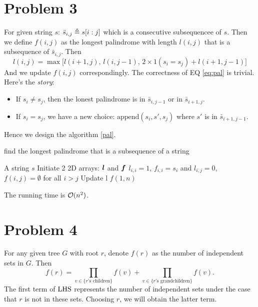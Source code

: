 \documentclass{article}
\begin{document}
\section*{Problem 3}
For given string $s$: $\bar{s}_{i,j}\triangleq s[i:j]$ which is a consecutive subsequencee of $s$. Then we define $f(i,j)$ as the longest palindrome with length $l(i,j)$ that is a subsequence of  $\bar{s}_{i,j}$.
Then
\begin{equation}
	\label{eq:pal}
	l(i,j)=\max\big[l(i+1,j),\,l(i,j-1),\,2\times1(s_i=s_j)+l(i+1,j-1)\big]
\end{equation}
And we update $f(i,j)$ correspondingly. The correctness of EQ \ref{eq:pal} is trivial. Here's the \textit{story}:
\begin{itemize}
	\item If $s_i\ne s_j$, then the lonest palindrome is in $\bar{s}_{i,j-1}$ or in  $\bar{s}_{i+1,j}$.
	\item If $s_i=s_j$, we have a new choice: $\mathrm{append}(s_i,s',s_j)$ where $s'$ is in $\bar{s}_{i+1,j-1}$.
\end{itemize}
Hence we design the algorithm \ref{pal}.
\begin{algorithm}[htbp]
	\caption{find the longest palindrome that is a subsequence of a string}
	\label{pal}
	\begin{algorithmic}[1]
		\renewcommand{\algorithmicrequire}{\textbf{Input:}}
		\renewcommand{\algorithmicensure}{\textbf{Output:}}
		\renewcommand{\algorithmiccomment}[1]{\hfill\textit{\textcolor{blue}{\##1}}}
		\REQUIRE A string $s$
		\STATE Initiate 2 2D arrays: $\boldsymbol{l}$ and $\boldsymbol{f}$
		\STATE $l_{i,i}=1$, $f_{i,i}=s_i$ and $l_{i,j}=0$, $f(i,j)=\emptyset$ for all  $i>j$
		\STATE Update l
		\ENDFOR
		\ENDFOR
		\RETURN $f(1,n)$
	\end{algorithmic}
\end{algorithm}

The running time is $\mathcal{O}(n^2)$.

\section*{Problem 4}
For any given tree $G$ with root $r$, denote $f(r)$ as the number of independent sets in $G$.
Then
\[
	f(r)
	=
	\prod_{v\in\{r\text{'s children}\}} f(v)
	+
	\prod_{v\in\{r\text{'s grandchildren}\}} f(v)
.\]
The first term of $\text{LHS}$ represents the number of independent sets under the case that $r$ is not in these sets.
Choosing $r$, we will obtain the latter term.
\end{document}
